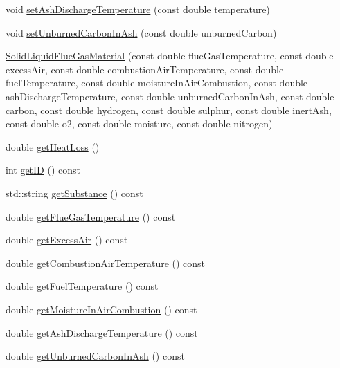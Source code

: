 \begin{DoxyCompactItemize}
void \hyperlink{class_solid_liquid_flue_gas_material_ad29543a88737c3d051c7d824287bc791}{set\+Ash\+Discharge\+Temperature} (const double temperature)
\item 
void \hyperlink{class_solid_liquid_flue_gas_material_adf052dd1bdceeab710a4986b1fd874b9}{set\+Unburned\+Carbon\+In\+Ash} (const double unburned\+Carbon)
\item 
\hyperlink{class_solid_liquid_flue_gas_material_a91e7c5e670b3db4fedcbc494448644d5}{Solid\+Liquid\+Flue\+Gas\+Material} (const double flue\+Gas\+Temperature, const double excess\+Air, const double combustion\+Air\+Temperature, const double fuel\+Temperature, const double moisture\+In\+Air\+Combustion, const double ash\+Discharge\+Temperature, const double unburned\+Carbon\+In\+Ash, const double carbon, const double hydrogen, const double sulphur, const double inert\+Ash, const double o2, const double moisture, const double nitrogen)
\item 
double \hyperlink{class_solid_liquid_flue_gas_material_af7d36673e49f9b5eb631fc04227883d6}{get\+Heat\+Loss} ()
\item 
int \hyperlink{class_solid_liquid_flue_gas_material_afb124b546137da7ba99e31616198e0c8}{get\+ID} () const
\item 
std\+::string \hyperlink{class_solid_liquid_flue_gas_material_a6e07a23fb05c15c7e5dba39334988de8}{get\+Substance} () const
\item 
double \hyperlink{class_solid_liquid_flue_gas_material_aba4604158b3c624496d7de4b5fb511e2}{get\+Flue\+Gas\+Temperature} () const
\item 
double \hyperlink{class_solid_liquid_flue_gas_material_a49e7bb4ebc45897c81b6f38610ceaf02}{get\+Excess\+Air} () const
\item 
double \hyperlink{class_solid_liquid_flue_gas_material_a8757b831e5a2ef26dbb0cf271c0e8207}{get\+Combustion\+Air\+Temperature} () const
\item 
double \hyperlink{class_solid_liquid_flue_gas_material_a629ecc7104b6bfbb696d9478c4b48e7a}{get\+Fuel\+Temperature} () const
\item 
double \hyperlink{class_solid_liquid_flue_gas_material_ae3d9780851b8217ed2885753f11ec18b}{get\+Moisture\+In\+Air\+Combustion} () const
\item 
double \hyperlink{class_solid_liquid_flue_gas_material_ab233d4e27397cc74fbe2d3084e4e6f7c}{get\+Ash\+Discharge\+Temperature} () const
\item 
double \hyperlink{class_solid_liquid_flue_gas_material_a53ac34a949168a35297ab3afb9eb2c7b}{get\+Unburned\+Carbon\+In\+Ash} () const

\end{DoxyCompactItemize}
